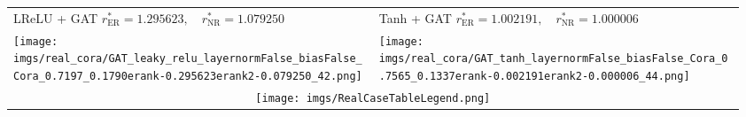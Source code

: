 \begin{tabular}{p{0.48\linewidth}|p{0.48\linewidth}}
        \midrule
        \makecell[c]{LReLU + GAT \\ $r^*_\mathrm{ER}=1.295623, \quad r^*_\mathrm{NR}=1.079250$} & \makecell[c]{Tanh + GAT \\ $r^*_\mathrm{ER}=1.002191, \quad r^*_\mathrm{NR}=1.000006$}\\
        \hspace{30pt}\texttt{[image: imgs/real\_cora/GAT\_leaky\_relu\_layernormFalse\_biasFalse\_Cora\_0.7197\_0.1790erank-0.295623erank2-0.079250\_42.png]} & \hspace{30pt}\texttt{[image: imgs/real\_cora/GAT\_tanh\_layernormFalse\_biasFalse\_Cora\_0.7565\_0.1337erank-0.002191erank2-0.000006\_44.png]}\\
        \midrule
        \multicolumn{2}{c}{\texttt{[image: imgs/RealCaseTableLegend.png]}} \\
        \bottomrule
    \end{tabular}